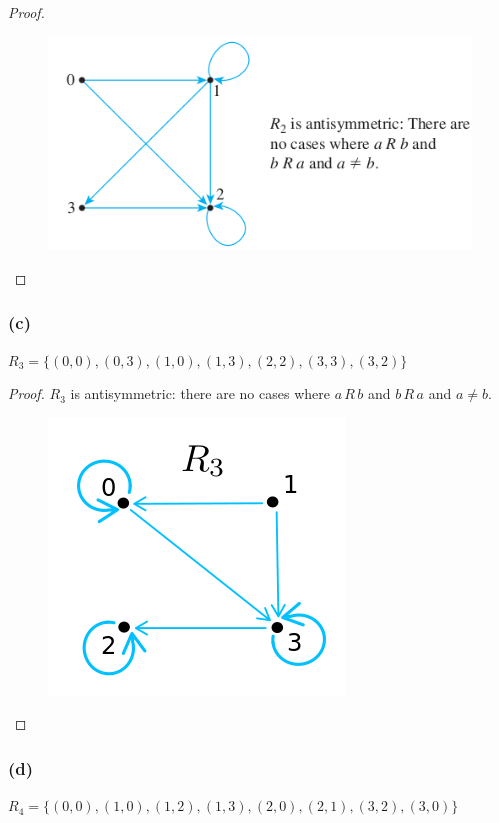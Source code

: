 \documentclass[14pt]{extarticle}
\begin{document}
\begin{proof}
\begin{figure}[ht!]
\centering
\includegraphics[scale=0.5]{../images/8.5.1.b.png}
\end{figure}
\end{proof}

\subsubsection{(c)}
\(R_3 = \{(0, 0), (0, 3), (1, 0), (1, 3), (2, 2), (3, 3),(3, 2)\}\)

\begin{proof}
\(R_3\) is antisymmetric: there are no cases where \(a \,R\, b\) and \(b \,R\, a\) and \(a \neq b\).
\begin{figure}[ht!]
\centering
\includegraphics[scale=0.5]{../images/8.5.1.c.png}
\end{figure}
\end{proof}

\subsubsection{(d)}
\(R_4 = \{(0, 0), (1, 0), (1, 2), (1, 3), (2, 0), (2, 1),(3, 2), (3, 0)\}\)
\end{document}
